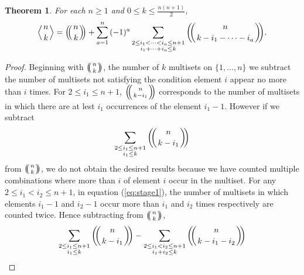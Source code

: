 \documentclass{article}
\theoremstyle{plain}
\newtheorem{thm}{Theorem}[section]
\theoremstyle{definition}
\numberwithin{thm}{section}
\begin{document}
			\begin{thm}\label{thm:trisetformula}
				For each $n\geq 1$ and $0\leq k \leq \frac{n(n+1)}{2}$,
				\begin{equation*}
					{\ensuremath{\left \langle \genfrac{}{}{0pt}{}{{n}}{{k}}\right \rangle}}={\ensuremath{\left(\kern-.3em\left(\genfrac{}{}{0pt}{}{{n}}{{k}}\right)\kern-.3em\right)}}+\sum_{a=1}^{n}
					{(-1)^a\sum_{\substack{2\leq i_1<\cdots<i_a\leq n+1 \\ i_1+\cdots+i_a\leq k}}{{\ensuremath{\left(\kern-.3em\left(\genfrac{}{}{0pt}{}{{n}}{{k-i_1-\cdots-i_a}}\right)\kern-.3em\right)}}}}.
				\end{equation*}
			\end{thm}
			\begin{proof}
				Beginning with ${\ensuremath{\left(\kern-.3em\left(\genfrac{}{}{0pt}{}{{n}}{{k}}\right)\kern-.3em\right)}}$, the number of $k$ multisets on $\{1,\dots,n\}$
				we subtract the number of multisets not satisfying the condition element $i$ appear no more than $i$ times.
				For $2\leq i_1\leq n+1$, ${\ensuremath{\left(\kern-.3em\left(\genfrac{}{}{0pt}{}{{n}}{{k-{i_1}}}\right)\kern-.3em\right)}}$ corresponds to the number of multisets in which there are at lest $i_1$ occurrences of the element $i_1-1$.
				However if we subtract
				\begin{equation}\label{eq:stage1}
					\sum_{\substack{2\leq i_1 \leq n+1 \\ i_1\leq k}}{{\ensuremath{\left(\kern-.3em\left(\genfrac{}{}{0pt}{}{{n}}{{k-i_1}}\right)\kern-.3em\right)}}}
				\end{equation}
				from ${\ensuremath{\left(\kern-.3em\left(\genfrac{}{}{0pt}{}{{n}}{{k}}\right)\kern-.3em\right)}}$, we do not obtain the desired results because we have counted multiple combinations where more than $i$ of element $i$ occur in the multiset.
				For any $2\leq i_1<i_2 \leq n+1$, in equation (\ref{eq:stage1}), the number of multisets in which elements $i_1-1$ and $i_2-1$
				occur more than $i_1$ and $i_2$ times respectively are counted twice.
				Hence subtracting from ${\ensuremath{\left(\kern-.3em\left(\genfrac{}{}{0pt}{}{{n}}{{k}}\right)\kern-.3em\right)}}$, 
				\begin{equation}\label{eq:stage2}
					\sum_{\substack{2\leq i_1 \leq n+1 \\ i_1\leq k}}{{\ensuremath{\left(\kern-.3em\left(\genfrac{}{}{0pt}{}{{n}}{{k-i_1}}\right)\kern-.3em\right)}}}-\sum_{\substack{2\leq i_1<i_2 \leq n+1 \\ i_1+i_2\leq k}}{{\ensuremath{\left(\kern-.3em\left(\genfrac{}{}{0pt}{}{{n}}{{k-i_1-i_2}}\right)\kern-.3em\right)}}}

\end{equation}
\end{proof}
\end{document}

